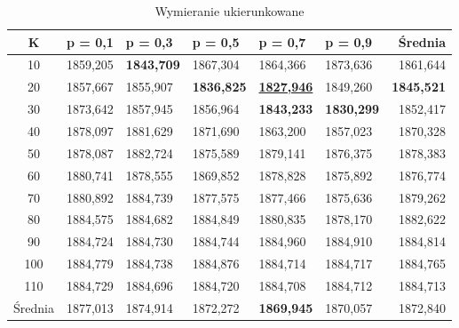 \documentclass[10pt]{article}
\begin{document}
\begin{table}[H]
\begin{subtable}{\textwidth}
\centering
\begin{tabularx}{0.8\textwidth}{c||X|X|X|X|X||r}
\hline
K & p = 0,1 & p = 0,3 & p = 0,5 & p = 0,7 & p = 0,9 & Średnia \\
\hline \hline
10 & 1859,205 & \textbf{1843,709} & 1867,304 & 1864,366 & 1873,636 & 1861,644 \\
20 & 1857,667 & 1855,907 & \textbf{1836,825} & \underline{\textbf{1827,946}} & 1849,260 & \textbf{1845,521} \\
30 & 1873,642 & 1857,945 & 1856,964 & \textbf{1843,233} & \textbf{1830,299} & 1852,417 \\
40 & 1878,097 & 1881,629 & 1871,690 & 1863,200 & 1857,023 & 1870,328 \\
50 & 1878,087 & 1882,724 & 1875,589 & 1879,141 & 1876,375 & 1878,383 \\
60 & 1880,741 & 1878,555 & 1869,852 & 1878,828 & 1875,892 & 1876,774 \\
70 & 1880,892 & 1884,739 & 1877,575 & 1877,466 & 1875,636 & 1879,262 \\
80 & 1884,575 & 1884,682 & 1884,849 & 1880,835 & 1878,170 & 1882,622 \\
90 & 1884,724 & 1884,730 & 1884,744 & 1884,960 & 1884,910 & 1884,814 \\
100 & 1884,779 & 1884,738 & 1884,876 & 1884,714 & 1884,717 & 1884,765 \\
110 & 1884,729 & 1884,696 & 1884,720 & 1884,708 & 1884,712 & 1884,713 \\
\hline
Średnia & 1877,013 & 1874,914 & 1872,272 & \textbf{1869,945} & 1870,057 & 1872,840 \\
\hline
\end{tabularx}
\caption{Wymieranie ukierunkowane}
\end{subtable}
\end{table}
\end{document}
